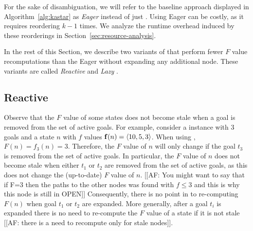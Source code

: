 For the sake of disambiguation, we will refer to the baseline approach displayed in Algorithm~\ref{alg:kastar} as \emph{Eager} \kastarphi instead of just \kastarphi.
Using Eager \kastar can be costly, as it requires reordering \open $k-1$ times. 
We analyze the runtime overhead induced by these reorderings in Section~\ref{sec:resource-analysis}.

In the rest of this Section, we describe two variants of \kastarphi that perform fewer $F$ value recomputations than the Eager \kastarphi without expanding any additional node.
These variants are called \emph{Reactive} \kastarphi and \emph{Lazy} \kastarphi.


\subsection{Reactive \kastarphi}
\label{sec:reactive}


Observe that the $F$ value of some states does not become stale when a goal is removed from the set of active goals.
For example, consider a \kgs instance with 3 goals and a state $n$ with $f$ values $\mathbf{f}(n)= \left \langle 10, 5, 3 \right \rangle $.
When using \kastarmin, $F(n)=f_3(n)=3$.
Therefore, the $F$ value of $n$ will only change if the goal $t_3$ is removed from the set of active goals.
In particular, the $F$ value of $n$ does not become stale when either $t_1$ or $t_2$ are removed from the set of active goals, as this does not change the (up-to-date) $F$ value of $n$. [[AF: You might want to say that if F=3 then the paths to the other nodes was found with $f \leq 3$ and this is why this node is still in OPEN]]
Consequently, there is no point in to re-computing $F(n)$ when goal $t_1$ or $t_2$ are expanded. More generally, after a goal $t_i$ is expanded there is no need to re-compute the $F$ value of a state if it is not stale  [[AF: there is a need to recompute only for stale nodes]]. %

